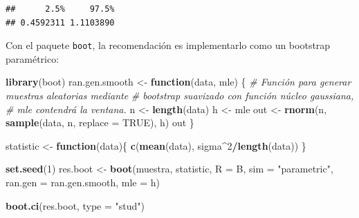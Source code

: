 \documentclass[]{book}
\newenvironment{Shaded}{\begin{snugshade}}{\end{snugshade}}
\newcommand{\KeywordTok}[1]{\textcolor[rgb]{0.13,0.29,0.53}{\textbf{#1}}}
\newcommand{\DataTypeTok}[1]{\textcolor[rgb]{0.13,0.29,0.53}{#1}}
\newcommand{\DecValTok}[1]{\textcolor[rgb]{0.00,0.00,0.81}{#1}}
\newcommand{\StringTok}[1]{\textcolor[rgb]{0.31,0.60,0.02}{#1}}
\newcommand{\CommentTok}[1]{\textcolor[rgb]{0.56,0.35,0.01}{\textit{#1}}}
\newcommand{\OtherTok}[1]{\textcolor[rgb]{0.56,0.35,0.01}{#1}}
\newcommand{\ControlFlowTok}[1]{\textcolor[rgb]{0.13,0.29,0.53}{\textbf{#1}}}
\newcommand{\OperatorTok}[1]{\textcolor[rgb]{0.81,0.36,0.00}{\textbf{#1}}}
\newcommand{\NormalTok}[1]{#1}
\theoremstyle{definition}
\theoremstyle{definition}
\theoremstyle{definition}
\theoremstyle{remark}
\begin{document}
\begin{Shaded}
\end{Shaded}

\begin{verbatim}
##      2.5%     97.5% 
## 0.4592311 1.1103890
\end{verbatim}

Con el paquete \texttt{boot}, la recomendación es implementarlo como un
bootstrap paramétrico:

\begin{Shaded}
\begin{Highlighting}[]
\KeywordTok{library}\NormalTok{(boot)}
\NormalTok{ran.gen.smooth <-}\StringTok{ }\ControlFlowTok{function}\NormalTok{(data, mle) \{}
    \CommentTok{# Función para generar muestras aleatorias mediante }
    \CommentTok{# bootstrap suavizado con función núcleo gaussiana,}
    \CommentTok{# mle contendrá la ventana.}
\NormalTok{    n <-}\StringTok{ }\KeywordTok{length}\NormalTok{(data)}
\NormalTok{    h <-}\StringTok{ }\NormalTok{mle}
\NormalTok{    out <-}\StringTok{ }\KeywordTok{rnorm}\NormalTok{(n, }\KeywordTok{sample}\NormalTok{(data, n, }\DataTypeTok{replace =} \OtherTok{TRUE}\NormalTok{), h)}
\NormalTok{    out}
\NormalTok{\}}

\NormalTok{statistic <-}\StringTok{ }\ControlFlowTok{function}\NormalTok{(data)\{}
    \KeywordTok{c}\NormalTok{(}\KeywordTok{mean}\NormalTok{(data), sigma}\OperatorTok{^}\DecValTok{2}\OperatorTok{/}\KeywordTok{length}\NormalTok{(data))}
\NormalTok{\}}

\KeywordTok{set.seed}\NormalTok{(}\DecValTok{1}\NormalTok{)}
\NormalTok{res.boot <-}\StringTok{ }\KeywordTok{boot}\NormalTok{(muestra, statistic, }\DataTypeTok{R =}\NormalTok{ B, }\DataTypeTok{sim =} \StringTok{"parametric"}\NormalTok{,}
                 \DataTypeTok{ran.gen =}\NormalTok{ ran.gen.smooth, }\DataTypeTok{mle =}\NormalTok{ h)}

\KeywordTok{boot.ci}\NormalTok{(res.boot, }\DataTypeTok{type =} \StringTok{"stud"}\NormalTok{)}
\end{Highlighting}
\end{Shaded}
\end{document}
